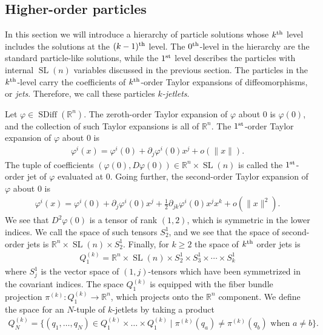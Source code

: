 \documentclass[12pt]{amsart}
\newcommand{\R}{\ensuremath{\mathbb{R}}}
\DeclareMathOperator{\SDiff}{SDiff}
\DeclareMathOperator{\SL}{SL}
\begin{document}
  \subsection{Higher-order particles}
  \label{sec:higher_order}
  In this section we will introduce a hierarchy of particle solutions whose $k^{\rm th}$ level includes the solutions at the $(k-1)^{\rm th}$ level.
  The $0^{\rm th}$-level in the hierarchy are the standard particle-like solutions,
  while the $1^{\rm st}$ level describes the particles with internal $\SL(n)$ variables
  discussed in the previous section.
  The particles in the $k^{\rm th}$-level carry the coefficients of
  $k^{\rm th}$-order Taylor expansions of diffeomorphisms,
  or \emph{jets}.
  Therefore, we call these particles \emph{$k$-jetlets}.

  Let $\varphi \in \SDiff(\R^n)$.
  The zeroth-order Taylor expansion of $\varphi$ about $0$
  is $\varphi(0)$, and the collection of such Taylor
  expansions is all of $\R^n$.
  The $1^{\rm st}$-order Taylor expansion of $\varphi$ about $0$ is
  \begin{align*}
    \varphi^i( x) = \varphi^i(0) + \partial_j \varphi^i(0) x^j + o( \|x\|).
  \end{align*}
  The tuple of coefficients $(\varphi(0) , D\varphi(0) ) \in \R^n \times \SL(n)$ is
  called the $1^{\rm st}$-order jet of $\varphi$ evaluated at $0$.
  Going further, the second-order Taylor expansion of $\varphi$ about $0$
  is
  \begin{align*}
    \varphi^i(x) = \varphi^i(0) + \partial_j \varphi^i(0) x^j + 
    \frac{1}{2} \partial_{jk} \varphi^i(0) x^j x^k + o( \| x\|^2).
  \end{align*}
  We see that $D^2\varphi(0)$ is a tensor of rank $(1,2)$, which is
  symmetric in the lower indices.
  We call the space of such tensors $S^1_2$,
  and we see that the space of second-order jets is $\R^n \times \SL(n) \times S^1_2$.
  Finally, for $k \geq 2$ the space of $k^{\rm th}$ order jets is
  \begin{align*}
    Q_1^{(k)} = \R^n \times \SL(n) \times S^1_2 \times S^1_3 \times \cdots\times S^1_k
  \end{align*}
  where $S^1_j$ is the vector space of $(1,j)$-tensors which
  have been symmetrized in the covariant indices.
  The space $Q_1^{(k)}$ is equipped with the fiber bundle
  projection $\pi^{(k)} : Q_1^{(k)} \to \R^n$,
  which projects onto the $\R^n$ component.
  We define the space for an $N$-tuple of $k$-jetlets by taking a product
  \begin{align*}
    Q^{(k)}_N = \{ (q_1,\dots, q_N) \in Q_1^{(k)} \times \dots \times Q_1^{(k)}
    \mid \pi^{(k)}(q_a) \neq \pi^{(k)}(q_b) \text{ when } a \neq b \}.
  \end{align*}
\end{document}
